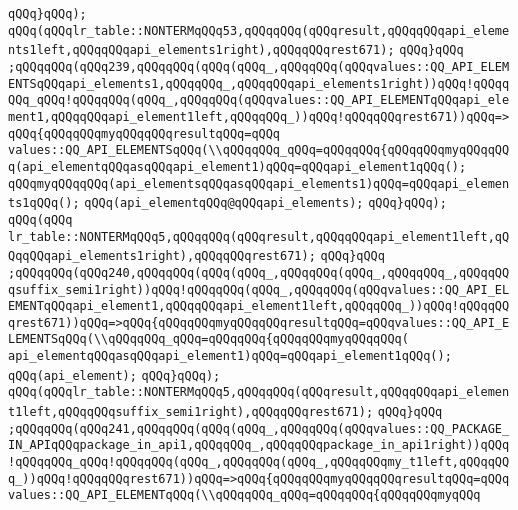 \verb|qQQq}qQQq);|\newline
\verb|qQQq(qQQqlr_table::NONTERMqQQq53,qQQqqQQq(qQQqresult,qQQqqQQqapi_elements1left,qQQqqQQqapi_elements1right),qQQqqQQqrest671);|\newline
\verb|qQQq}qQQq|\newline
\verb|;qQQqqQQq(qQQq239,qQQqqQQq(qQQq(qQQq_,qQQqqQQq(qQQqvalues::QQ_API_ELEMENTSqQQqapi_elements1,qQQqqQQq_,qQQqqQQqapi_elements1right))qQQq!qQQqqQQq_qQQq!qQQqqQQq(qQQq_,qQQqqQQq(qQQqvalues::QQ_API_ELEMENTqQQqapi_element1,qQQqqQQqapi_element1left,qQQqqQQq_))qQQq!qQQqqQQqrest671))qQQq=>qQQq{qQQqqQQqmyqQQqqQQqresultqQQq=qQQq|\newline
\verb|values::QQ_API_ELEMENTSqQQq(\\qQQqqQQq_qQQq=qQQqqQQq{qQQqqQQqmyqQQqqQQq(api_elementqQQqasqQQqapi_element1)qQQq=qQQqapi_element1qQQq();|\newline
\verb|qQQqmyqQQqqQQq(api_elementsqQQqasqQQqapi_elements1)qQQq=qQQqapi_elements1qQQq();|\newline
\verb|qQQq(api_elementqQQq@qQQqapi_elements);|\newline
\verb|qQQq}qQQq);|\newline
\verb|qQQq(qQQq|\newline
\verb|lr_table::NONTERMqQQq5,qQQqqQQq(qQQqresult,qQQqqQQqapi_element1left,qQQqqQQqapi_elements1right),qQQqqQQqrest671);|\newline
\verb|qQQq}qQQq|\newline
\verb|;qQQqqQQq(qQQq240,qQQqqQQq(qQQq(qQQq_,qQQqqQQq(qQQq_,qQQqqQQq_,qQQqqQQqsuffix_semi1right))qQQq!qQQqqQQq(qQQq_,qQQqqQQq(qQQqvalues::QQ_API_ELEMENTqQQqapi_element1,qQQqqQQqapi_element1left,qQQqqQQq_))qQQq!qQQqqQQqrest671))qQQq=>qQQq{qQQqqQQqmyqQQqqQQqresultqQQq=qQQqvalues::QQ_API_ELEMENTSqQQq(\\qQQqqQQq_qQQq=qQQqqQQq{qQQqqQQqmyqQQqqQQq(|\newline
\verb|api_elementqQQqasqQQqapi_element1)qQQq=qQQqapi_element1qQQq();|\newline
\verb|qQQq(api_element);|\newline
\verb|qQQq}qQQq);|\newline
\verb|qQQq(qQQqlr_table::NONTERMqQQq5,qQQqqQQq(qQQqresult,qQQqqQQqapi_element1left,qQQqqQQqsuffix_semi1right),qQQqqQQqrest671);|\newline
\verb|qQQq}qQQq|\newline
\verb|;qQQqqQQq(qQQq241,qQQqqQQq(qQQq(qQQq_,qQQqqQQq(qQQqvalues::QQ_PACKAGE_IN_APIqQQqpackage_in_api1,qQQqqQQq_,qQQqqQQqpackage_in_api1right))qQQq!qQQqqQQq_qQQq!qQQqqQQq(qQQq_,qQQqqQQq(qQQq_,qQQqqQQqmy_t1left,qQQqqQQq_))qQQq!qQQqqQQqrest671))qQQq=>qQQq{qQQqqQQqmyqQQqqQQqresultqQQq=qQQqvalues::QQ_API_ELEMENTqQQq(\\qQQqqQQq_qQQq=qQQqqQQq{qQQqqQQqmyqQQq|\newline
